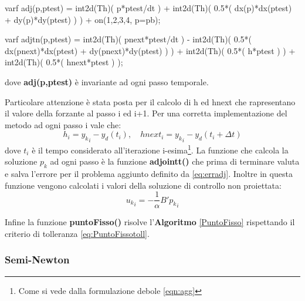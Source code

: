 \begin{Code}[caption={Matrici \texttt{adj(w,wtest)} e \texttt{adjtn(w,wtest)}}]
varf adj(p,ptest) =   int2d(Th)( p*ptest/dt )			
					+ int2d(Th)( 0.5*( dx(p)*dx(ptest) + dy(p)*dy(ptest) ) ) 
				    + on(1,2,3,4, p=pb);

varf adjtn(p,ptest) =   int2d(Th)( pnext*ptest/dt )
    				  - int2d(Th)( 0.5*( dx(pnext)*dx(ptest) + dy(pnext)*dy(ptest) ) ) 
  					  + int2d(Th)( 0.5*( h*ptest ) ) 
  					  + int2d(Th)( 0.5*( hnext*ptest ) ); 
\end{Code}
dove \textbf{adj(p,ptest)} è invariante ad ogni passo temporale.
\par
Particolare attenzione è stata posta per il calcolo di h ed hnext che rapresentano il valore della forzante al passo i ed i+1. Per una corretta implementazione del metodo ad ogni passo i vale che:
\begin{equation}
h_i = {y_k}_i - y_d(t_i), \quad
hnext_i = {y_k}_i - y_d(t_i+{\Delta}t)
\label{hhnext}
\end{equation}
dove $t_i$ è il tempo considerato all'iterazione i-esima\footnote{Come si vede dalla formulazione debole \eqref{eqn:agg}}.
La funzione che calcola la soluzione $p_k$ ad ogni passo è la funzione \textbf{adjointt()} che prima di terminare valuta e salva l'errore per il problema aggiunto definito da \eqref{eq:erradj}. Inoltre in questa funzione vengono calcolati i valori della soluzione di controllo non proiettata:
\begin{equation}
{u_k}_i = -\frac{1}{\alpha}B'{p_k}_i  %
\label{unp}
\end{equation}
\par
Infine la funzione \textbf{puntoFisso()} risolve l'\textbf{Algoritmo} \ref{PuntoFisso} rispettando il criterio di tolleranza \eqref{eq:PuntoFissotoll}.

\subsubsection{Semi-Newton}